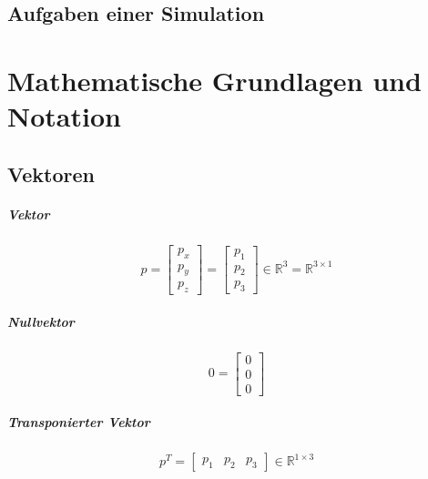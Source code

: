\documentclass[a4paper, 11pt, accentcolor = tud3b]{tudreport}
\begin{document}
        \section{Aufgaben einer Simulation} %

    \chapter{Mathematische Grundlagen und Notation} %
        \section{Vektoren} %
	        \paragraph{Vektor}
	        \begin{equation*}
		        p =
		        \begin{bmatrix}
			        p _ x \\
			        p _ y \\
			        p _ z
		        \end{bmatrix}
		        =
		        \begin{bmatrix}
			        p _ 1 \\
			        p _ 2 \\
			        p _ 3
		        \end{bmatrix}
		        \in \mathbb{R} ^ 3 = \mathbb{R} ^ { 3 \times 1 } \tag{Spaltenvektor}
			\end{equation*}
			
			\paragraph{Nullvektor}
			\begin{equation*}
		        0 =
		        \begin{bmatrix}
			        0 \\
			        0 \\
			        0
		        \end{bmatrix}
			\end{equation*}
			
			\paragraph{Transponierter Vektor}
			\begin{equation*}
		        p ^ T =
		        \begin{bmatrix}
			        p _ 1 & p _ 2 & p _ 3
		        \end{bmatrix}
		        \in \mathbb{R} ^ { 1 \times 3 } \tag{Zeilenvektor}
			\end{equation*}
			
\end{document}
